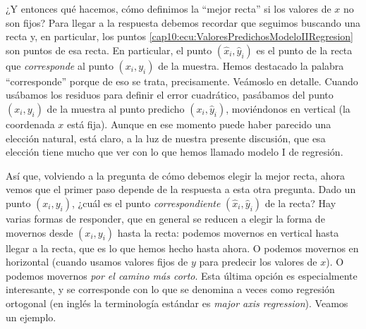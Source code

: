¿Y entonces qué hacemos, cómo definimos la ``mejor recta'' si los valores de $x$ no son fijos? Para llegar a la respuesta debemos  recordar que seguimos buscando una recta y, en particular, los puntos \ref{cap10:ecu:ValoresPredichosModeloIIRegresion} son puntos de esa recta.  En particular, el punto $(\hat x_i, \hat y_i)$ es el punto de la recta que {\em corresponde} al punto $(x_i, y_i)$ de la muestra. Hemos destacado la palabra ``corresponde'' porque de eso se trata, precisamente. Veámoslo en detalle. Cuando usábamos los residuos para definir el error cuadrático, pasábamos del punto $(x_i, y_i)$ de la muestra al punto predicho $(x_i, \hat y_i)$, moviéndonos en vertical (la coordenada $x$ está fija). Aunque en ese momento puede haber parecido una elección natural, está claro, a la luz de nuestra presente discusión, que esa elección tiene mucho que ver con lo que hemos llamado modelo I de regresión.

Así que, volviendo a la pregunta de cómo debemos elegir la mejor recta, ahora vemos que el primer paso depende de la respuesta a esta otra pregunta. Dado un punto $(x_i, y_i)$, ¿cuál es el punto {\em correspondiente} $(\hat x_i, \hat y_i)$ de la recta? Hay varias formas de responder, que en general se reducen a elegir la forma de movernos desde $(x_i, y_i)$ hasta la recta: podemos movernos en vertical hasta llegar a la recta, que es lo que hemos hecho hasta ahora. O podemos movernos en horizontal (cuando usamos valores fijos de $y$ para predecir los valores de $x$).
O podemos movernos {\em por el camino más corto}. Esta última opción es especialmente interesante, y se corresponde con lo que se denomina a veces como {\sf regresión ortogonal} (en inglés la terminología estándar es  {\em major axis regression}). Veamos un ejemplo.

